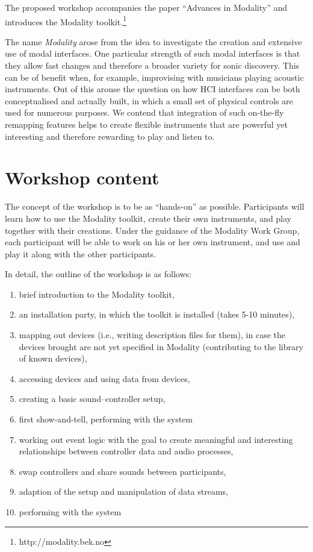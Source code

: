 \documentclass{article}
\begin{document}
The proposed workshop accompanies the paper ``Advances in Modality'' and introduces the Modality toolkit.\footnote{http://modality.bek.no}

The name \emph{Modality} arose from the idea to investigate the creation and extensive use of modal interfaces.
One particular strength of such modal interfaces is that they allow fast changes and therefore a broader variety for sonic discovery.
This can be of benefit when, for example, improvising with musicians playing acoustic instruments.
Out of this arouse the question on how HCI interfaces can be both conceptualised and actually built, in which a small set of physical controls are used for numerous purposes.
We contend that integration of such on-the-fly remapping features helps to create flexible instruments that are powerful yet interesting and therefore rewarding to play and listen to. 


\section{Workshop content}
\label{sec:workshop_content}

The concept of the workshop is to be as “hands-­on” as possible.
Participants will learn how to use the Modality toolkit, create their own instruments, and play together with their creations. 
Under the guidance of the Modality Work Group, each participant will be able to work on his or her own instrument, and use and play it along with the other participants.

In detail, the outline of the workshop is as follows:

\begin{enumerate}\itemsep0em
	\item brief introduction to the Modality toolkit,
	\item an installation party, in which the toolkit is installed (takes 5-10 minutes),
	\item mapping out devices (i.e., writing description files for them), in case the devices brought are not yet specified in Modality (contributing to the library of known devices),
	\item accessing devices and using data from devices,
	\item creating a basic sound--controller setup,
	\item first show-and-tell, performing with the system
	\item working out event logic with the goal to create meaningful and interesting relationships between controller data and audio processes,
	\item swap controllers and share sounds between participants,
	\item adaption of the setup and manipulation of data streams,
	\item performing with the system
\end{enumerate}
\end{document}
